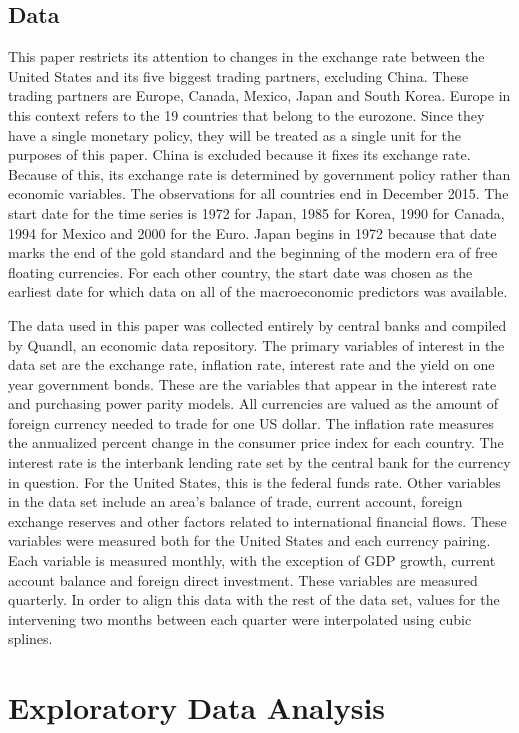 \documentclass{sig-alternate-05-2015}
\begin{document}
\subsection{Data}
This paper restricts its attention to changes in the exchange rate between the United States and its five biggest trading partners, excluding China. These trading partners are Europe, Canada, Mexico, Japan and South Korea. Europe in this context refers to the 19 countries that belong to the eurozone. Since they have a single monetary policy, they will be treated as a single unit for the purposes of this paper. China is excluded because it fixes its exchange rate. Because of this, its exchange rate is determined by government policy rather than economic variables. The observations for all countries end in December 2015. The start date for the time series is 1972 for Japan, 1985 for Korea, 1990 for Canada, 1994 for Mexico and 2000 for the Euro. Japan begins in 1972 because that date marks the end of the gold standard and the beginning of the modern era of free floating currencies. For each other country, the start date was chosen as the earliest date for which data on all of the macroeconomic predictors was available. 
\par{} The data used in this paper was collected entirely by central banks and compiled by Quandl, an economic data repository. The primary variables of interest in the data set are the exchange rate, inflation rate, interest rate and the yield on one year government bonds. These are the variables that appear in the interest rate and purchasing power parity models. All currencies are valued as the amount of foreign currency needed to trade for one US dollar. The inflation rate measures the annualized percent change in the consumer price index for each country. The interest rate is the interbank lending rate set by the central bank for the currency in question. For the United States, this is the federal funds rate.  Other variables in the data set include an area's balance of trade, current account, foreign exchange reserves and other factors related to international financial flows. These variables were measured both for the United States and each currency pairing. Each variable is measured monthly, with the exception of GDP growth, current account balance and foreign direct investment. These variables are measured quarterly. In order to align this data with the rest of the data set, values for the intervening two months between each quarter were interpolated using cubic splines.

\section{Exploratory Data Analysis}
\end{document}
